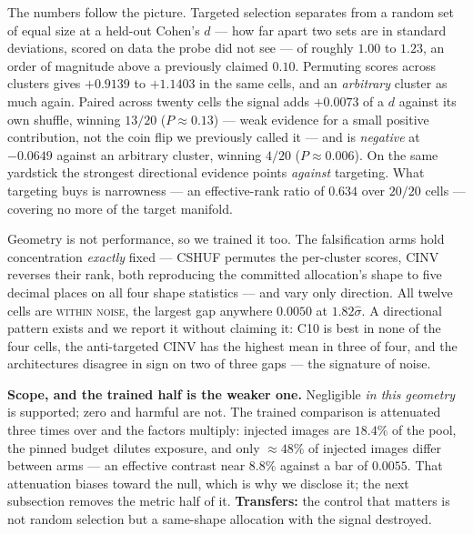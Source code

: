 \documentclass{article} %
\begin{document}
The numbers follow the picture. Targeted selection separates from a random set of equal size at a
held-out Cohen's $d$ --- how far apart two sets are in standard deviations, scored on data the probe
did not see --- of roughly $1.00$ to $1.23$, an order of magnitude above a previously claimed $0.10$.
Permuting scores across clusters gives $+0.9139$ to $+1.1403$ in the same cells, and an
\emph{arbitrary} cluster as much again. Paired across twenty cells the signal adds $+0.0073$ of a
$d$ against its own shuffle, winning $13/20$ ($P \approx 0.13$) --- weak evidence for a small
positive contribution, not the coin flip we previously called it --- and is \emph{negative} at
$-0.0649$ against an arbitrary cluster, winning $4/20$ ($P \approx 0.006$). On the same yardstick
the strongest directional evidence points \emph{against} targeting. What targeting buys is
narrowness --- an effective-rank ratio of $0.634$ over $20/20$ cells --- covering no more of the
target manifold.

Geometry is not performance, so we trained it too. The falsification arms hold concentration
\emph{exactly} fixed --- CSHUF permutes the per-cluster scores, CINV reverses their rank, both
reproducing the committed allocation's shape to five decimal places on all four shape statistics ---
and vary only direction. All twelve cells are \textsc{within noise}, the largest gap anywhere
$0.0050$ at $1.82\hat{\sigma}$. A directional pattern exists and we report it without claiming it:
C10 is best in none of the four cells, the anti-targeted CINV has the highest mean in three of four,
and the architectures disagree in sign on two of three gaps --- the signature of noise.

\textbf{Scope, and the trained half is the weaker one.} Negligible \emph{in this geometry} is
supported; zero and harmful are not. The trained comparison is attenuated three times over and the
factors multiply: injected images are $18.4\%$ of the pool, the pinned budget dilutes exposure, and
only $\approx 48\%$ of injected images differ between arms --- an effective contrast near $8.8\%$
against a bar of $0.0055$. That attenuation biases toward the null, which is why we disclose it; the
next subsection removes the metric half of it. \textbf{Transfers:} the control that matters is not
random selection but a same-shape allocation with the signal destroyed.
\end{document}
